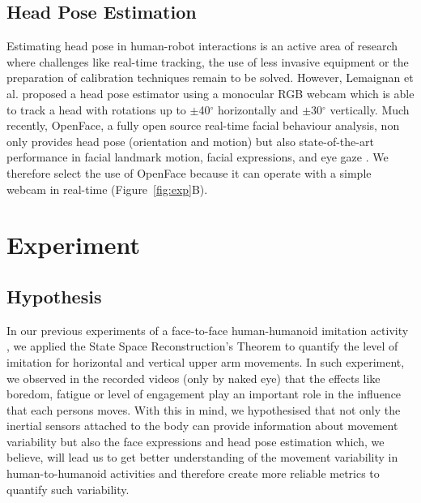 \documentclass{sigchi}
\begin{document}
\subsection{Head Pose Estimation}
Estimating head pose in human-robot interactions is an active area of research
where challenges like real-time tracking, the use of less invasive equipment
or the preparation of calibration techniques remain to be solved.
However, Lemaignan et al. \cite{Lemaignan2016} proposed a head pose estimator
using a monocular RGB webcam which is able to track a head with rotations up
to $\pm$40$^{\circ}$ horizontally and $\pm$30$^{\circ}$ vertically.
Much recently, OpenFace, a fully open source real-time facial behaviour analysis,
non only provides head pose (orientation and motion) but also state-of-the-art
performance in facial landmark motion, facial expressions, and eye gaze \cite{Baltrusaitis2016}.
We therefore select the use of OpenFace because it can operate with a simple webcam
in real-time (Figure~\ref{fig:exp}B).



\section{Experiment}

\subsection{Hypothesis}
In our previous experiments of a face-to-face human-humanoid imitation
activity \cite{XXX2017}, we applied the State Space Reconstruction's Theorem
to quantify the level of imitation for horizontal and vertical upper arm movements.
In such experiment, we observed in the recorded videos (only by naked eye)
that the effects like boredom, fatigue or level of engagement play an important
role in the influence that each persons moves.
With this in mind, we hypothesised that not only the inertial sensors attached
to the body can provide information about movement variability but also the
face expressions and head pose estimation which, we believe, will lead us
to get better understanding of the movement variability in human-to-humanoid
activities and therefore create more reliable metrics to quantify such variability.
\end{document}
